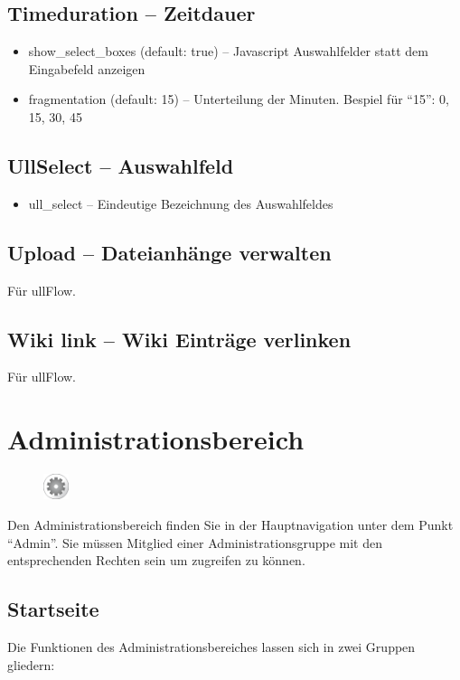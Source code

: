 \documentclass[article, a4paper, oneside, 11pt]{memoir}
\begin{document}
\subsection{Timeduration -- Zeitdauer}
\begin{itemize}
\item show\_select\_boxes (default: true) -- Javascript Auswahlfelder statt dem Eingabefeld anzeigen
\item fragmentation (default: 15) -- Unterteilung der Minuten. Bespiel für "`15"': 0, 15, 30, 45
\end{itemize}
\subsection{UllSelect -- Auswahlfeld}
\begin{itemize}
\item ull\_select -- Eindeutige Bezeichnung des Auswahlfeldes
\end{itemize}
\subsection[Upload -- Dateianhänge verwalten]{Upload -- Dateianhänge verwalten}
Für ullFlow.

\subsection{Wiki link -- Wiki Einträge verlinken}
Für ullFlow.

\section{Administrationsbereich}

\begin{figure}
\vspace{-5pt}
\includegraphics[width=0.75cm]{figures/ullrightgermanexport-img7.png}
\vspace{-20pt}
\end{figure}

Den Administrationsbereich finden Sie in der Hauptnavigation unter dem Punkt "`Admin"'. Sie müssen Mitglied einer Administrationsgruppe mit den entsprechenden Rechten sein um zugreifen zu können.

\subsection{Startseite}
Die Funktionen des Administrationsbereiches lassen sich in zwei Gruppen gliedern:
\end{document}
